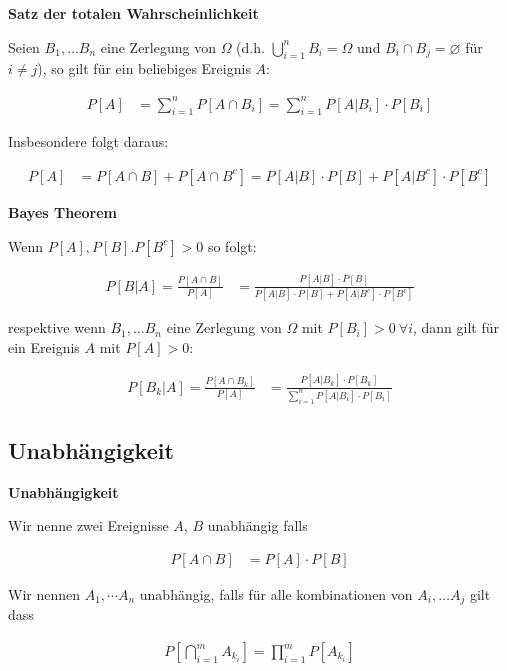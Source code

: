 \documentclass[25pt]{sciposter}
\newenvironment{method}[1]{\begin{mdframed}[backgroundcolor=blue!10,innertopmargin=15pt, innerbottommargin=15pt]
		\textbf{#1 }
	}
	{ 
	\end{mdframed}
}
\newenvironment{thm}[1]{\begin{mdframed}[backgroundcolor=pink!50,innertopmargin=15pt, innerbottommargin=15pt, nobreak=false]
		\textbf{#1 }
	}
	{ 
	\end{mdframed}
}
\begin{document}
\begin{multicols}{3}
\begin{thm}{Satz der totalen Wahrscheinlichkeit}
	 Seien $B_1, \ldots B_n$ eine Zerlegung von $\Omega$ (d.h. $\bigcup_{i=1}^n B_i = \Omega$ und $B_i \cap B_j = \varnothing$ für $i\neq j$), so gilt für ein beliebiges Ereignis $A$:
	 
	 \begin{align*}
	 	P[A] &= \sum_{i=1}^{n} P[A\cap B_i] = \sum_{i=1}^{n} P[A|B_i]\cdot P[B_i]
	 \end{align*}
	 
	 Insbesondere folgt daraus:
	 
	 \begin{align*}
	 	P[A] &= P[A\cap B] + P[A \cap B^c] = P[A|B]\cdot P[B] + P[A|B^c]\cdot P[B^c]
	 \end{align*}
\end{thm}


\begin{thm}{Bayes Theorem}
	Wenn $P[A],P[B].P[B^c]> 0$ so folgt:
	
	\begin{align*}
		P[B|A] = \frac{P[A\cap B]}{P[A]} &= \frac{P[A|B]\cdot P[B]}{P[A|B]\cdot P[B] + P[A|B^c]\cdot P[B^c]}
	\end{align*}
	
	respektive wenn $B_1, \ldots B_n$ eine Zerlegung von $\Omega$ mit $P[B_i]>0 \  \forall i$, dann gilt für ein Ereignis $A$ mit $P[A]>0$:
	
	\begin{align*}
		P[B_k|A] = \frac{P[A\cap B_k]}{P[A]} &= \frac{P[A|B_k]\cdot P[B_k]}{\sum_{i=1}^{n} P[A|B_i] \cdot P[B_i] }
	\end{align*}
\end{thm}


\subsection*{Unabhängigkeit}

\begin{method}{Unabhängigkeit}
	
	Wir nenne zwei Ereignisse $A$, $B$ unabhängig falls
	
	\begin{align*}
		P[A\cap B] &= P[A] \cdot P[B]
	\end{align*}
	
	
	Wir nennen $A_1,\cdots A_n$ unabhängig, falls für alle kombinationen von $A_i, \ldots A_j$ gilt dass
	
	\begin{align*}
		P\left[\bigcap_{i=1}^{m} A_{k_i} \right] = \prod_{i=1}^{m}P[A_{k_i}]
	\end{align*}
	

\end{method}
\end{multicols}
\end{document}
